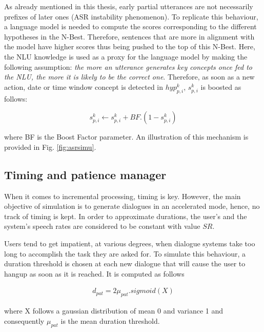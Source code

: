         As already mentioned in this thesis, early partial utterances are not necessarily prefixes of later ones (ASR instability phenomenon). To replicate this behaviour, a language model is needed to compute the scores corresponding to the different hypotheses in the N-Best. Therefore, sentences that are more in alignment with the model have higher scores thus being pushed to the top of this N-Best. Here, the NLU knowledge is used as a proxy for the language model by making the following assumption: \textit{the more an utterance generates key concepts once fed to the NLU, the more it is likely to be the correct one}. Therefore, as soon as a new action, date or time window concept is detected in $hyp^k_{p,i}$, $s^k_{p,i}$ is boosted as follows:
        
        	$$ s^k_{p,i} \leftarrow s^k_{p,i} + BF.(1 - s^k_{p,i}) $$
            
      	where BF is the Boost Factor parameter. An illustration of this mechanism is provided in Fig. \ref{fig:asrsimu}.
				
    
    \subsection{Timing and patience manager}
    
    	When it comes to incremental processing, timing is key. However, the main objective of simulation is to generate dialogues in an accelerated mode, hence, no track of timing is kept. In order to approximate durations, the user's and the system's speech rates are considered to be constant with value $SR$.
			
        
        Users tend to get impatient, at various degrees, when dialogue systems take too long to accomplish the task they are asked for. To simulate this behaviour, a duration threshold is chosen at each new dialogue that will cause the user to hangup as soon as it is reached. It is computed as follows
        
       	\begin{eqnarray}
        	d_{pat} = 2 \mu_{pat}.sigmoid(X)
        \end{eqnarray}
        
        where X follows a gaussian distribution of mean 0 and variance 1 and consequently $\mu_{pat}$ is the mean duration threshold.
				
    
